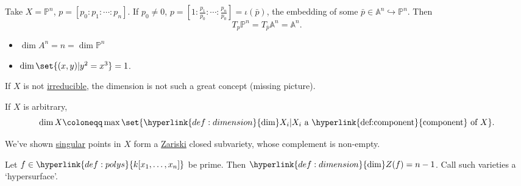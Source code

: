 \documentclass{article}
\newcommand{\A}{\mathbb{A}}
\newcommand{\proj}{\mathbb{P}}
\begin{document}
\begin{eg}
    Take $X = \proj^n$, $p = [p_0: p_1: \dotsb: p_n]$. If $p_0 \neq 0$, $p = [1: \frac{p_1}{p_0} : \dotsb : \frac{p_n}{p_0}] = \iota(\bar{p})$, the embedding of some $\bar{p} \in \A^n \hookrightarrow \proj^n$. Then
    \begin{equation*}
        T_p \proj^n = T_{\bar{p}} \A^n = \A^n.
    \end{equation*}
\end{eg}
\begin{eg}\leavevmode
    \begin{itemize}
        \item $\dim A^n = n = \dim \proj^n$
        \item $\dim \set{(x, y) | y^2 = x^3} = 1$.
    \end{itemize}
\end{eg}
If $X$ is not \hyperlink{def:reducible}{irreducible}, the dimension is not such a great concept (missing picture).
\begin{defi}
    If $X$ is arbitrary,
    \begin{equation*}\dim X \coloneqq \max\set{\hyperlink{def:dimension}{\dim} X_i | X_i \text{ a \hyperlink{def:component}{component} of } X}.\end{equation*}
\end{defi}
We've shown \hyperlink{def:smooth}{singular} points in $X$ form a \hyperlink{def:zariski}{Zariski} closed subvariety, whose complement is non-empty. %
\begin{lemma}
    Let $f \in \hyperlink{def:polys}{k[x_1, \dotsc, x_n]}$ be prime. Then $\hyperlink{def:dimension}{\dim} Z(f) = n-1$. Call such varieties a `hypersurface'.
\end{lemma}
\end{document}
